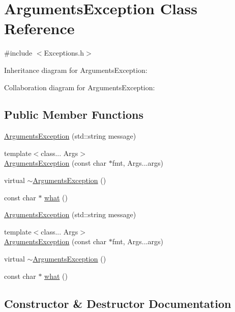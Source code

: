 \hypertarget{classArgumentsException}{}\section{Arguments\+Exception Class Reference}
\label{classArgumentsException}


{\ttfamily \#include $<$Exceptions.\+h$>$}



Inheritance diagram for Arguments\+Exception\+:


Collaboration diagram for Arguments\+Exception\+:
\subsection*{Public Member Functions}
\begin{DoxyCompactItemize}
\item 
\hyperlink{classArgumentsException_a9a2ed96b51bb2656bc9d9f357c5a9b42}{Arguments\+Exception} (std\+::string message)
\item 
{\footnotesize template$<$class... Args$>$ }\\\hyperlink{classArgumentsException_af5958cd547ab696bc9b0a010548f681f}{Arguments\+Exception} (const char $\ast$fmt, Args...\+args)
\item 
virtual \hyperlink{classArgumentsException_a468ecb17b1b07f0491a6f262220f3b96}{$\sim$\+Arguments\+Exception} ()
\item 
const char $\ast$ \hyperlink{classArgumentsException_aa970dadd44c523df99070343c164343c}{what} ()
\item 
\hyperlink{classArgumentsException_a9a2ed96b51bb2656bc9d9f357c5a9b42}{Arguments\+Exception} (std\+::string message)
\item 
{\footnotesize template$<$class... Args$>$ }\\\hyperlink{classArgumentsException_af5958cd547ab696bc9b0a010548f681f}{Arguments\+Exception} (const char $\ast$fmt, Args...\+args)
\item 
virtual \hyperlink{classArgumentsException_a468ecb17b1b07f0491a6f262220f3b96}{$\sim$\+Arguments\+Exception} ()
\item 
const char $\ast$ \hyperlink{classArgumentsException_a1e2379ac714eacebdd9ac6bda52592f1}{what} ()
\end{DoxyCompactItemize}


\subsection{Constructor \& Destructor Documentation}

